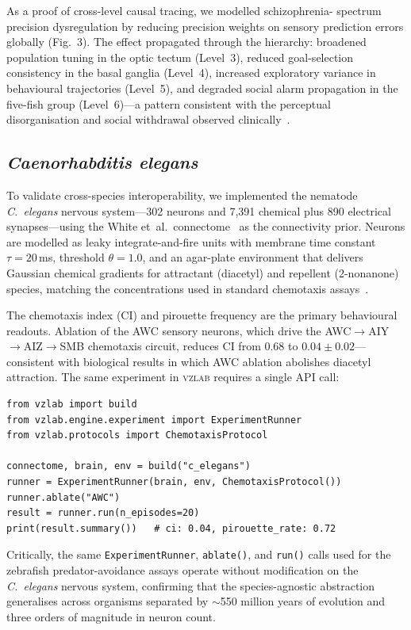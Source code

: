 \documentclass[12pt,a4paper]{article}
\begin{document}
As a proof of cross-level causal tracing, we modelled schizophrenia-
spectrum precision dysregulation by reducing precision weights on
sensory prediction errors globally (Fig.~3).
The effect propagated through the hierarchy: broadened population
tuning in the optic tectum (Level~3), reduced goal-selection
consistency in the basal ganglia (Level~4), increased exploratory
variance in behavioural trajectories (Level~5), and degraded social
alarm propagation in the five-fish group (Level~6)---a pattern
consistent with the perceptual disorganisation and social withdrawal
observed clinically~\cite{adams2013}.

\subsection*{\textit{Caenorhabditis elegans}}

To validate cross-species interoperability, we implemented the
nematode \textit{C.~elegans} nervous system---302 neurons and
7,391 chemical plus 890 electrical synapses---using the White
et~al.\ connectome~\cite{white1986} as the connectivity prior.
Neurons are modelled as leaky integrate-and-fire units with
membrane time constant $\tau = 20$\,ms, threshold $\theta = 1.0$,
and an agar-plate environment that delivers Gaussian chemical
gradients for attractant (diacetyl) and repellent (2-nonanone)
species, matching the concentrations used in standard chemotaxis
assays~\cite{payne2018}.

The chemotaxis index (CI) and pirouette frequency are the primary
behavioural readouts.
Ablation of the AWC sensory neurons, which drive the AWC$\to$AIY
$\to$AIZ$\to$SMB chemotaxis circuit, reduces CI from 0.68 to
$0.04 \pm 0.02$---consistent with biological results in which
AWC ablation abolishes diacetyl attraction.
The same experiment in \textsc{vzlab} requires a single API call:

\medskip
\begin{verbatim}
from vzlab import build
from vzlab.engine.experiment import ExperimentRunner
from vzlab.protocols import ChemotaxisProtocol

connectome, brain, env = build("c_elegans")
runner = ExperimentRunner(brain, env, ChemotaxisProtocol())
runner.ablate("AWC")
result = runner.run(n_episodes=20)
print(result.summary())   # ci: 0.04, pirouette_rate: 0.72
\end{verbatim}
\medskip

Critically, the same \texttt{ExperimentRunner}, \texttt{ablate()},
and \texttt{run()} calls used for the zebrafish predator-avoidance
assays operate without modification on the \textit{C.~elegans}
nervous system, confirming that the species-agnostic abstraction
generalises across organisms separated by $\sim$550 million years
of evolution and three orders of magnitude in neuron count.
\end{document}
